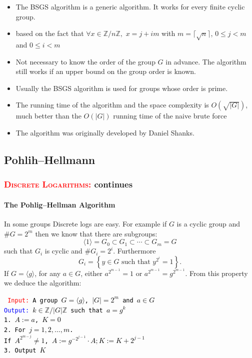 \documentclass[10pt,handout]{beamer} %
\newcommand{\Z}{\mathbb Z}
\theoremstyle{definition}
\begin{document}
\begin{frame}
\begin{itemize}[<+-| alert@+>]
  \item The BSGS algorithm is a generic algorithm. It works for every finite cyclic group.
 \item based on the fact that $\forall x\in\Z/n\Z,$  $x=j+ i m$ with $m=\lceil\sqrt{n}\rceil$, $0\le j<m$ and $0\le i<m$
 \item  Not necessary to know the order of the group $G$ in advance. The algorithm still works if an upper bound on the group order is known.
 \item Usually the BSGS algorithm is used for groups whose order is prime.
 \item The running time of the algorithm and the space complexity is $O(\sqrt{|G|})$, much better than the $O(|G|)$ 
 running time of the naive brute force
 \item The algorithm was originally developed by Daniel Shanks.
 \end{itemize}
\end{frame}

\subsection{Pohlih--Hellmann}
\begin{frame}
\frametitle{\textcolor{red}{\textsc{Discrete Logarithms:}} continues} 
\framesubtitle{The Pohlig--Hellman Algorithm}

 In some groups Discrete logs are easy. For example if $G$ is a cyclic group and $\#G=2^m$ then we know
that there are subgroups:\pause
$$\langle1\rangle=G_0\subset G_1\subset\cdots\subset G_m=G$$\pause
such that $G_i$ is cyclic and $\#G_i=2^i$. Furthermore
$$G_i=\left\{y\in G\text{ such that } y^{2^i}=1\right\}.$$\pause
If $G=\langle g\rangle$, for any $a\in G$, either $a^{2^{m-1}}=1$
or $a^{2^{m-1}}=g^{2^{m-1}}$. \pause
From this property we deduce the algorithm:
\begin{center}\fbox
{\textcolor{black}{
\begin{minipage}[c]{9cm}
\texttt{\noindent 
\textcolor{red}{Input:}  A group $G=\langle g\rangle$, $|G|=2^m$ and $a\in G$\\
\textcolor{blue}{Output:}  $k\in\Z/|G|\Z$ such that $a=g^k$\\
1. $A:=a$, $K=0$\\
2. For $j=1,2,\ldots, m$.\\
\hspace*{.7cm} \qquad If $A^{2^{m-j}}\neq 1$, $A:=g^{-2^{j-1}}\cdot A; K:=K+2^{j-1}$\\
3. Output $K$}
\end{minipage}}}
\end{center}
\end{frame}
\end{document}
